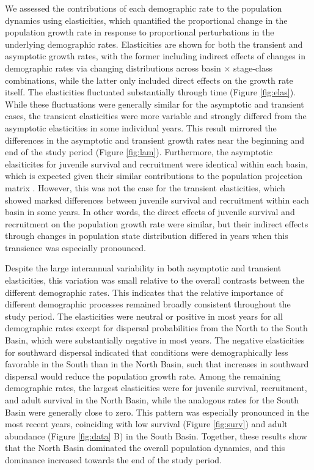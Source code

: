 \documentclass[11pt]{article}
\begin{document}
We assessed the contributions of each demographic rate to the population dynamics
using elasticities,
which quantified the proportional change in the population growth rate in 
response to proportional perturbations in the underlying demographic rates.
Elasticities are shown for both the transient and asymptotic growth rates,
with the former including indirect effects of changes in demographic rates
via changing distributions across basin $\times$ stage-class combinations, 
while the latter only included direct effects on the growth rate itself.
The elasticities fluctuated substantially through time (Figure \ref{fig:elas}).
While these fluctuations were generally similar for the asymptotic and transient cases,
the transient elasticities were more variable and strongly differed 
from the asymptotic elasticities in some individual years.
This result mirrored the differences in the asymptotic and transient growth rates 
near the beginning and end of the study period (Figure \ref{fig:lam}).
Furthermore, the asymptotic elasiticites for juvenile survival and recruitment
were identical within each basin, 
which is expected given their similar contributions to the population projection matrix
\citep{caswell2001matrix}.
However, this was not the case for the transient elasticities, which showed marked differences
between juvenile survival and recruitment within each basin in some years. 
In other words, the direct effects of juvenile survival and recruitment on the population growth rate were similar, but their indirect effects 
through changes in population state distribution differed
in years when this transience was especially pronounced.

Despite the large interannual variability in both asymptotic and transient elasticities,
this variation was small relative to the overall contrasts 
between the different demographic rates. 
This indicates that the relative importance of different demographic processes
remained broadly consistent throughout the study period.
The elasticities were neutral or positive in most years for all demographic rates 
except for dispersal probabilities from the North to the South Basin,
which were substantially negative in most years.
The negative elasticities for southward dispersal indicated that conditions were 
demographically less favorable in the South than in the North Basin,
such that increases in southward dispersal would reduce the population growth rate.
Among the remaining demographic rates,
the largest elasticities were for juvenile survival, recruitment, and adult survival
in the North Basin, while the analogous rates for the South Basin were generally close to zero.
This pattern was especially pronounced in the most recent years,
coinciding with low survival (Figure \ref{fig:surv}) 
and adult abundance (Figure \ref{fig:data} B) in the South Basin.
Together, these results show that the North Basin dominated 
the overall population dynamics, 
and this dominance increased towards the end of the study period.
\end{document}
